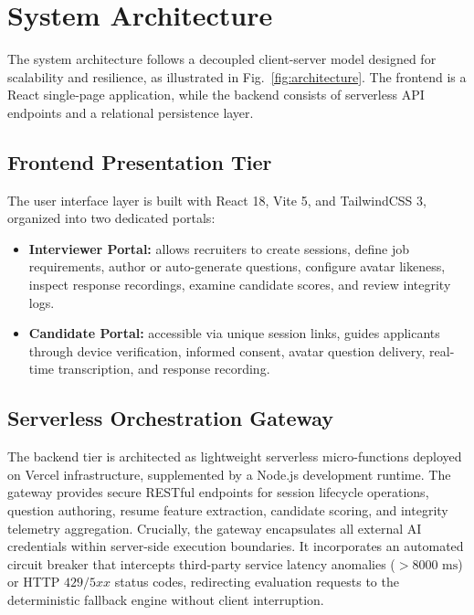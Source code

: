 \documentclass[conference]{IEEEtran}
\begin{document}
\section{System Architecture}

The system architecture follows a decoupled client-server model designed for scalability and resilience, as illustrated in Fig.~\ref{fig:architecture}. The frontend is a React single-page application, while the backend consists of serverless API endpoints and a relational persistence layer.

\subsection{Frontend Presentation Tier}

The user interface layer is built with React 18, Vite 5, and TailwindCSS 3, organized into two dedicated portals:
\begin{itemize}
    \item \textbf{Interviewer Portal:} allows recruiters to create sessions, define job requirements, author or auto-generate questions, configure avatar likeness, inspect response recordings, examine candidate scores, and review integrity logs.
    \item \textbf{Candidate Portal:} accessible via unique session links, guides applicants through device verification, informed consent, avatar question delivery, real-time transcription, and response recording.
\end{itemize}

\subsection{Serverless Orchestration Gateway}

The backend tier is architected as lightweight serverless micro-functions deployed on Vercel infrastructure, supplemented by a Node.js development runtime. The gateway provides secure RESTful endpoints for session lifecycle operations, question authoring, resume feature extraction, candidate scoring, and integrity telemetry aggregation. Crucially, the gateway encapsulates all external AI credentials within server-side execution boundaries. It incorporates an automated circuit breaker that intercepts third-party service latency anomalies ($> 8000\text{ ms}$) or HTTP $429/5xx$ status codes, redirecting evaluation requests to the deterministic fallback engine without client interruption.
\end{document}
